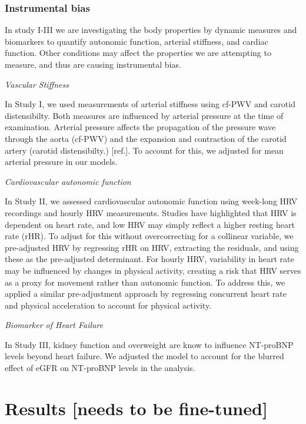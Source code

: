 \documentclass[
  a4paper,
  headsepline=true,
  open=any]{scrbook}
\begin{document}
\hypertarget{instrumental-bias}{%
\subsection{Instrumental bias}\label{instrumental-bias}}

In study I-III we are investigating the body properties by dynamic
measures and biomarkers to quantify autonomic function, arterial
stiffness, and cardiac function. Other conditions may affect the
properties we are attempting to measure, and thus are causing
instrumental bias.

\emph{Vascular Stiffness}

In Study I, we used measurements of arterial stiffness using cf-PWV and
carotid distensibilty. Both measures are influenced by arterial pressure
at the time of examination. Arterial pressure affects the propagation of
the pressure wave through the aorta (cf-PWV) and the expansion and
contraction of the carotid artery (carotid distensibilty.) {[}ref.{]}.
To account for this, we adjusted for mean arterial pressure in our
models.

\emph{Cardiovascular autonomic function}

In Study II, we assessed cardiovascular autonomic function using
week-long HRV recordings and hourly HRV measurements. Studies have
highlighted that HRV is dependent on heart rate, and low HRV may simply
reflect a higher resting heart rate (rHR). To adjust for this without
overcorrecting for a collinear variable, we pre-adjusted HRV by
regressing rHR on HRV, extracting the residuals, and using these as the
pre-adjusted determinant. For hourly HRV, variability in heart rate may
be influenced by changes in physical activity, creating a risk that HRV
serves as a proxy for movement rather than autonomic function. To
address this, we applied a similar pre-adjustment approach by regressing
concurrent heart rate and physical acceleration to account for physical
activity.

\emph{Biomarker of Heart Failure}

In Study III, kidney function and overweight are know to influence
NT-proBNP levels beyond heart failure. We adjusted the model to account
for the blurred effect of eGFR on NT-proBNP levels in the analysis.


\hypertarget{results-needs-to-be-fine-tuned}{%
\chapter{Results {[}needs to be
fine-tuned{]}}\label{results-needs-to-be-fine-tuned}}
\end{document}

